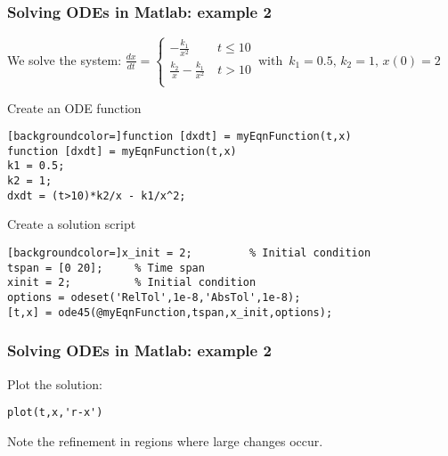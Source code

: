 \begin{frame}[fragile]
  \frametitle{Solving ODEs in Matlab: example 2}
  We solve the system: $\displaystyle \frac{dx}{dt} = \begin{cases}
    -\frac{k_1}{x^2} \quad\ \quad t \leq 10\\
    \frac{k_2}{x} - \frac{k_1}{x^2} \quad  t > 10\\
 \end{cases}\, \text{with }\, k_1 = 0.5,\, k_2 = 1,\, x(0) = 2$
 \vspace*{1ex}
  \begin{block}{Create an ODE function}
    \begin{lstlisting}[backgroundcolor=]function [dxdt] = myEqnFunction(t,x)
function [dxdt] = myEqnFunction(t,x)
k1 = 0.5;
k2 = 1;
dxdt = (t>10)*k2/x - k1/x^2;
\end{lstlisting}
  \end{block}
  \pause
  \begin{block}{Create a solution script}
    \begin{lstlisting}[backgroundcolor=]x_init = 2;         % Initial condition
tspan = [0 20];     % Time span
xinit = 2;          % Initial condition
options = odeset('RelTol',1e-8,'AbsTol',1e-8);
[t,x] = ode45(@myEqnFunction,tspan,x_init,options);\end{lstlisting}
  \end{block}
\vfill
\end{frame}

\begin{frame}[fragile]
  \frametitle{Solving ODEs in Matlab: example 2}
  Plot the solution:
  \begin{lstlisting}
plot(t,x,'r-x')
  \end{lstlisting}
  \pause
  \begin{center}
  \end{center}
  Note the refinement in regions where large changes occur.
\end{frame}

